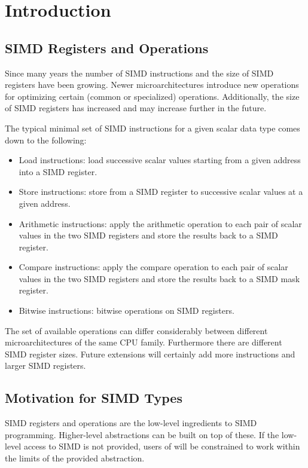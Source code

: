 \section{Introduction}
\subsection{SIMD Registers and Operations}
Since many years the number of SIMD instructions and the size of SIMD registers have been growing.
Newer microarchitectures introduce new operations for optimizing certain (common or specialized) operations.
Additionally, the size of SIMD registers has increased and may increase further in the future.

The typical minimal set of SIMD instructions for a given scalar data type comes down to the following:
\begin{itemize}
  \item Load instructions: load  successive scalar values starting from a given address into a SIMD register.
  \item Store instructions: store from a SIMD register to  successive scalar values at a given address.
  \item Arithmetic instructions: apply the arithmetic operation to each pair of scalar values in the two SIMD registers and store the results back to a SIMD register.
  \item Compare instructions: apply the compare operation to each pair of scalar values in the two SIMD registers and store the results back to a SIMD mask register.
  \item Bitwise instructions: bitwise operations on SIMD registers.
\end{itemize}

The set of available operations can differ considerably between different microarchitectures of the same CPU family.
Furthermore there are different SIMD register sizes.
Future extensions will certainly add more instructions and larger SIMD registers.

\subsection{Motivation for SIMD Types}
SIMD registers and operations are the low-level ingredients to SIMD programming.
Higher-level abstractions can be built on top of these.
If the low-level access to SIMD is not provided, users of \CC{} will be constrained to work within the limits of the provided abstraction.

